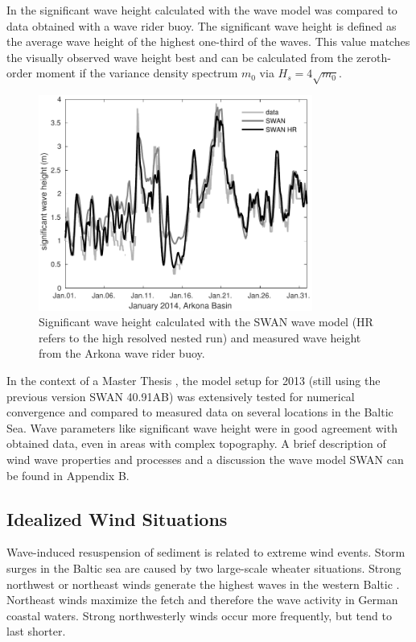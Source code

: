 In  the significant wave height calculated with the wave model was 
compared to data obtained with a wave rider buoy. The significant wave height 
is defined as the average wave height of the highest one-third of the waves. 
This value matches the visually observed wave height best and can be calculated 
from the zeroth-order moment if the variance density spectrum $m_0$ via 
$H_s = 4 \sqrt{m_0}$.
\begin{figure}[ht]
 \includegraphics[width=9cm]{bilder/januar.pdf}
 \caption{Significant wave height calculated with the SWAN wave model (HR 
refers to the high resolved nested run) and measured wave height from the 
Arkona wave rider buoy.\label{verify}}
\end{figure}

In the context of a Master Thesis \citep[][]{masterarbeitronja}, the model 
setup for 2013 (still using the previous version SWAN 40.91AB) was 
extensively tested for numerical convergence and compared to measured data on 
several locations in the Baltic Sea. Wave parameters like significant wave 
height were in good agreement with obtained data, even in areas with complex 
topography. A brief description of wind wave properties and processes and a 
discussion the wave model SWAN can be found in Appendix B.

\subsection{Idealized Wind Situations}

Wave-induced resuspension of sediment is related to extreme wind events. Storm 
surges in the Baltic sea are caused by two large-scale wheater 
situations. Strong northwest or northeast winds generate the highest 
waves in the western Baltic \citep[][]{balticsea}. Northeast winds maximize the 
fetch and therefore the wave activity in German coastal waters. Strong 
northwesterly winds occur more frequently, but tend to last shorter. 

